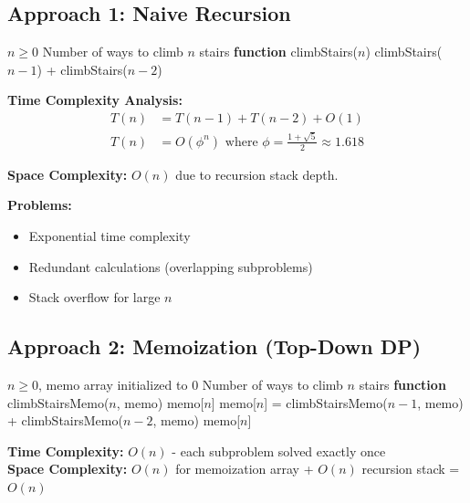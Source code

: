 \documentclass[12pt,a4paper]{article}
\begin{document}
\subsection{Approach 1: Naive Recursion}

\begin{algorithm}
\caption{Climbing Stairs - Recursive Approach}
\begin{algorithmic}
\REQUIRE $n \geq 0$
\ENSURE Number of ways to climb $n$ stairs
\STATE \textbf{function} climbStairs($n$)
\ENDIF
\RETURN climbStairs($n-1$) + climbStairs($n-2$)
\end{algorithmic}
\end{algorithm}

\textbf{Time Complexity Analysis:}
\begin{align}
T(n) &= T(n-1) + T(n-2) + O(1) \\
T(n) &= O(\phi^n) \text{ where } \phi = \frac{1+\sqrt{5}}{2} \approx 1.618
\end{align}

\textbf{Space Complexity:} $O(n)$ due to recursion stack depth.

\textbf{Problems:}
\begin{itemize}
\item Exponential time complexity
\item Redundant calculations (overlapping subproblems)
\item Stack overflow for large $n$
\end{itemize}

\subsection{Approach 2: Memoization (Top-Down DP)}

\begin{algorithm}
\caption{Climbing Stairs - Memoization}
\begin{algorithmic}
\REQUIRE $n \geq 0$, memo array initialized to 0
\ENSURE Number of ways to climb $n$ stairs
\STATE \textbf{function} climbStairsMemo($n$, memo)
\ENDIF
{}
    \RETURN memo[$n$]
\ENDIF
\STATE memo[$n$] = climbStairsMemo($n-1$, memo) + climbStairsMemo($n-2$, memo)
\RETURN memo[$n$]
\end{algorithmic}
\end{algorithm}

\textbf{Time Complexity:} $O(n)$ - each subproblem solved exactly once \\
\textbf{Space Complexity:} $O(n)$ for memoization array + $O(n)$ recursion stack = $O(n)$
\end{document}
